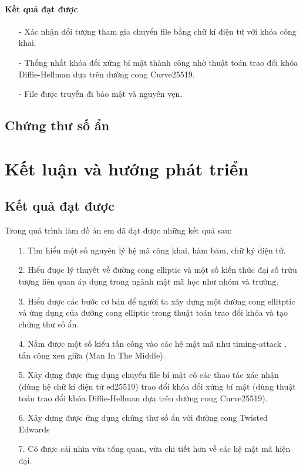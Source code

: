 \documentclass[a4paper,12pt]{report}
\begin{document}
\subsubsection*{Kết quả đạt được}
\begin{itemize}
\item[-] Xác nhận đối tượng tham gia chuyển file bằng chữ kí điện tử với khóa công khai.
\item[-] Thống nhất khóa đối xứng bí mật thành công nhờ thuật toán trao đổi khóa Diffie-Hellman dựa trên đường cong Curve25519.
\item[-] File được truyền đi bảo mật và nguyên vẹn.
\end{itemize}
\section{Chứng thư số ẩn}
\chapter*{Kết luận và hướng phát triển}
\section*{Kết quả đạt được}
Trong quá trình làm đồ án em đã đạt được những kết quả sau:
\begin{itemize}
\item[1. ] Tìm hiểu một số nguyên lý hệ mã công khai, hàm băm, chữ ký điện tử.
\item[2. ] Hiểu được lý thuyết về đường cong elliptic và một số kiến thức đại số trừu tượng liên quan áp dụng trong ngành mật mã học như nhóm và trường.
\item[3. ] Hiểu được các bước cơ bản để người ta xây dựng một đường cong ellitptic và ứng dụng của đường cong elliptic trong thuật toán trao đổi khóa và tạo chứng thư số ẩn.
\item[4. ] Nắm được một số kiểu tấn công vào các hệ mật mã như timing-attack , tấn công xen giữa (Man In The Middle).
\item[5. ] Xây dựng được ứng dụng chuyển file bí mật có các thao tác xác nhận (dùng hệ chữ kí điện tử ed25519) trao đổi khóa đối xứng bí mật (dùng thuật toán trao đổi khóa Diffie-Hellman dựa trên đường cong Curve25519).
\item[6. ] Xây dựng được ứng dụng chứng thư số ẩn với đường cong Twisted Edwards
\item[7. ] Có được cái nhìn vừa tổng quan, vừa chi tiết hơn về các hệ mật mã hiện đại.
\end{itemize}
\end{document}
